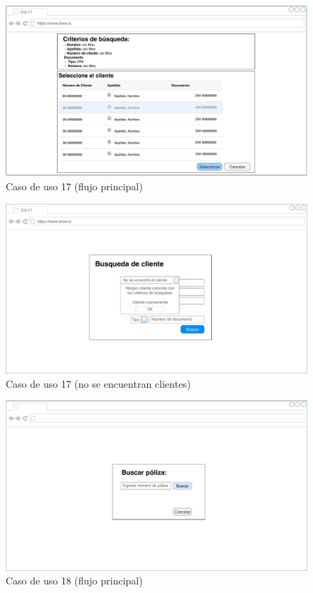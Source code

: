 \documentclass[12pt]{article}
\begin{document}
\vfill
\begin{figure}[h!]
\includegraphics[width=\textwidth]{CU17/CU-172.pdf}
\caption{Caso de uso 17 (flujo principal)}
\end{figure}
\vfill

\vfill
\begin{figure}[h!]
\includegraphics[width=\textwidth]{CU17/CU-173.pdf}
\caption{Caso de uso 17 (no se encuentran clientes)}
\end{figure}
\vfill




\vfill
\begin{figure}[h!]
\includegraphics[width=\textwidth]{CU18/CU-181.pdf}
\caption{Caso de uso 18 (flujo principal)}
\end{figure}
\vfill
\end{document}
